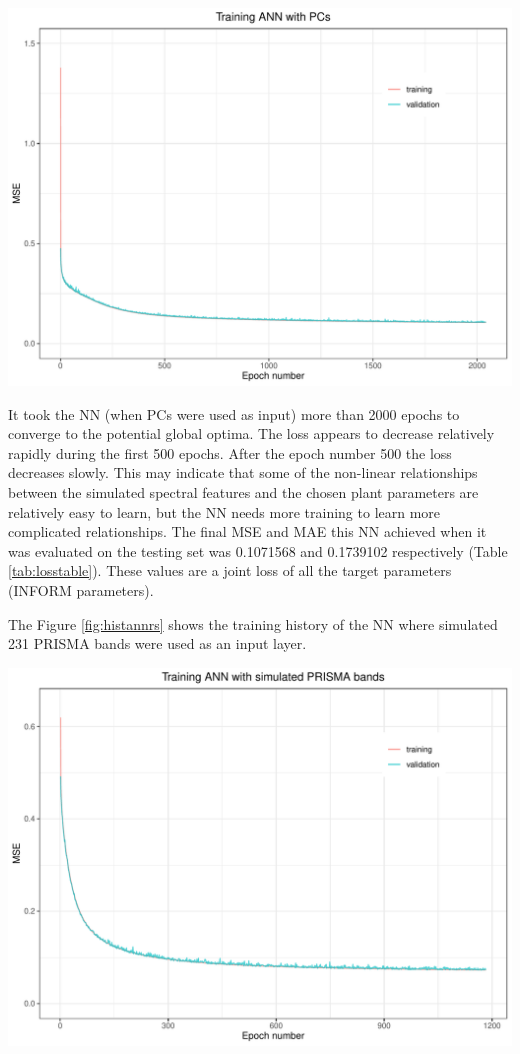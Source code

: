 \documentclass[a4paper, twoside]{templates/ociamthesis}
\let\origfigure\figure
\let\endorigfigure\endfigure
\renewenvironment{figure}[1][2] {
    \expandafter\origfigure\expandafter[H]
} {
    \endorigfigure
}
\begin{document}
\begin{figure}
\includegraphics[width=0.9\linewidth]{./figures/hist_annpca} \caption{Training history of ANN with PCs}\label{fig:histannpca}
\end{figure}

It took the NN (when PCs were used as input) more than 2000 epochs to converge to the potential global optima. The loss appears to decrease relatively rapidly during the first 500 epochs. After the epoch number 500 the loss decreases slowly. This may indicate that some of the non-linear relationships between the simulated spectral features and the chosen plant parameters are relatively easy to learn, but the NN needs more training to learn more complicated relationships. The final MSE and MAE this NN achieved when it was evaluated on the testing set was 0.1071568 and 0.1739102 respectively (Table \ref{tab:losstable}). These values are a joint loss of all the target parameters (INFORM parameters).

The Figure \ref{fig:histannrs} shows the training history of the NN where simulated 231 PRISMA bands were used as an input layer.

\begin{figure}
\includegraphics[width=0.9\linewidth]{./figures/hist_annrs} \caption{Training history of ANN with simulated PRISMA bands}\label{fig:histannrs}
\end{figure}
\end{document}
